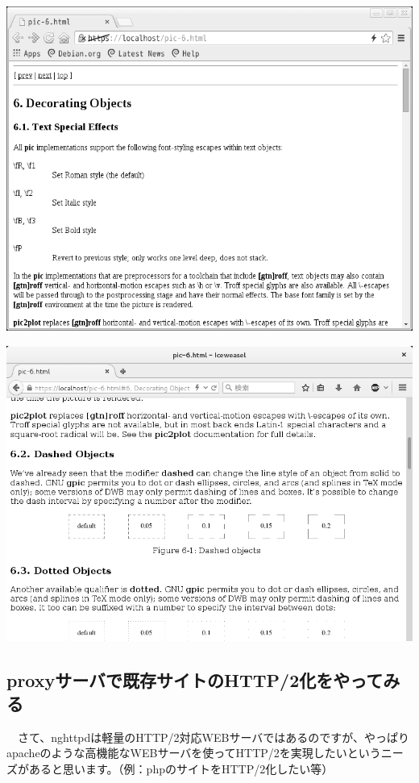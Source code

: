 \documentclass[mingoth,a4paper]{jsarticle}
\begin{document}
\begin{minipage}{0.5\hsize}
\includegraphics[width=0.9\hsize]{image201507/chromium-groff-access_mono.png}
\end{minipage}
\begin{minipage}{0.5\hsize}
\includegraphics[width=0.9\hsize]{image201507/iceweasel-groff-access_mono.png}
\end{minipage}
 
\subsection{proxyサーバで既存サイトのHTTP/2化をやってみる}

　さて、nghttpdは軽量のHTTP/2対応WEBサーバではあるのですが、やっぱりapacheのような高機能なWEBサーバを使ってHTTP/2を実現したいというニーズがあると思います。（例：phpのサイトをHTTP/2化したい等）
\end{document}
